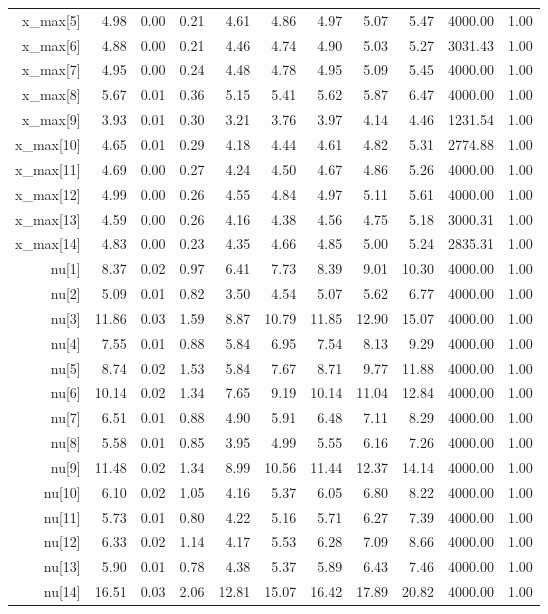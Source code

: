 \begin{longtable}{rrrrrrrrrrr}
  x_max[5] & 4.98 & 0.00 & 0.21 & 4.61 & 4.86 & 4.97 & 5.07 & 5.47 & 4000.00 & 1.00 \\ 
  x_max[6] & 4.88 & 0.00 & 0.21 & 4.46 & 4.74 & 4.90 & 5.03 & 5.27 & 3031.43 & 1.00 \\ 
  x_max[7] & 4.95 & 0.00 & 0.24 & 4.48 & 4.78 & 4.95 & 5.09 & 5.45 & 4000.00 & 1.00 \\ 
  x_max[8] & 5.67 & 0.01 & 0.36 & 5.15 & 5.41 & 5.62 & 5.87 & 6.47 & 4000.00 & 1.00 \\ 
  x_max[9] & 3.93 & 0.01 & 0.30 & 3.21 & 3.76 & 3.97 & 4.14 & 4.46 & 1231.54 & 1.00 \\ 
  x_max[10] & 4.65 & 0.01 & 0.29 & 4.18 & 4.44 & 4.61 & 4.82 & 5.31 & 2774.88 & 1.00 \\ 
  x_max[11] & 4.69 & 0.00 & 0.27 & 4.24 & 4.50 & 4.67 & 4.86 & 5.26 & 4000.00 & 1.00 \\ 
  x_max[12] & 4.99 & 0.00 & 0.26 & 4.55 & 4.84 & 4.97 & 5.11 & 5.61 & 4000.00 & 1.00 \\ 
  x_max[13] & 4.59 & 0.00 & 0.26 & 4.16 & 4.38 & 4.56 & 4.75 & 5.18 & 3000.31 & 1.00 \\ 
  x_max[14] & 4.83 & 0.00 & 0.23 & 4.35 & 4.66 & 4.85 & 5.00 & 5.24 & 2835.31 & 1.00 \\ 
  nu[1] & 8.37 & 0.02 & 0.97 & 6.41 & 7.73 & 8.39 & 9.01 & 10.30 & 4000.00 & 1.00 \\ 
  nu[2] & 5.09 & 0.01 & 0.82 & 3.50 & 4.54 & 5.07 & 5.62 & 6.77 & 4000.00 & 1.00 \\ 
  nu[3] & 11.86 & 0.03 & 1.59 & 8.87 & 10.79 & 11.85 & 12.90 & 15.07 & 4000.00 & 1.00 \\ 
  nu[4] & 7.55 & 0.01 & 0.88 & 5.84 & 6.95 & 7.54 & 8.13 & 9.29 & 4000.00 & 1.00 \\ 
  nu[5] & 8.74 & 0.02 & 1.53 & 5.84 & 7.67 & 8.71 & 9.77 & 11.88 & 4000.00 & 1.00 \\ 
  nu[6] & 10.14 & 0.02 & 1.34 & 7.65 & 9.19 & 10.14 & 11.04 & 12.84 & 4000.00 & 1.00 \\ 
  nu[7] & 6.51 & 0.01 & 0.88 & 4.90 & 5.91 & 6.48 & 7.11 & 8.29 & 4000.00 & 1.00 \\ 
  nu[8] & 5.58 & 0.01 & 0.85 & 3.95 & 4.99 & 5.55 & 6.16 & 7.26 & 4000.00 & 1.00 \\ 
  nu[9] & 11.48 & 0.02 & 1.34 & 8.99 & 10.56 & 11.44 & 12.37 & 14.14 & 4000.00 & 1.00 \\ 
  nu[10] & 6.10 & 0.02 & 1.05 & 4.16 & 5.37 & 6.05 & 6.80 & 8.22 & 4000.00 & 1.00 \\ 
  nu[11] & 5.73 & 0.01 & 0.80 & 4.22 & 5.16 & 5.71 & 6.27 & 7.39 & 4000.00 & 1.00 \\ 
  nu[12] & 6.33 & 0.02 & 1.14 & 4.17 & 5.53 & 6.28 & 7.09 & 8.66 & 4000.00 & 1.00 \\ 
  nu[13] & 5.90 & 0.01 & 0.78 & 4.38 & 5.37 & 5.89 & 6.43 & 7.46 & 4000.00 & 1.00 \\ 
  nu[14] & 16.51 & 0.03 & 2.06 & 12.81 & 15.07 & 16.42 & 17.89 & 20.82 & 4000.00 & 1.00 \\ 
   \hline
\hline
\end{longtable}
